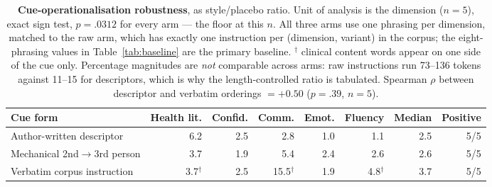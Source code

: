 \begin{table}[t]\centering\footnotesize
\setlength{\tabcolsep}{4pt}
\begin{tabular}{@{}lrrrrrrr@{}}
\toprule
Cue form & Health lit. & Confid. & Comm. & Emot. & Fluency & Median & Positive \\
\midrule
Author-written descriptor & 6.2 & 2.5 & 2.8 & 1.0 & 1.1 & 2.5 & 5/5 \\
Mechanical 2nd$\to$3rd person & 3.7 & 1.9 & 5.4 & 2.4 & 2.6 & 2.6 & 5/5 \\
Verbatim corpus instruction & 3.7$^\dagger$ & 2.5 & 15.5$^\dagger$ & 1.9 & 4.8$^\dagger$ & 3.7 & 5/5 \\
\bottomrule
\end{tabular}
\caption{\textbf{Cue-operationalisation robustness}, as style/placebo ratio. Unit of analysis is the dimension
($n=5$), exact sign test, $p=.0312$ for every arm --- the floor at this $n$. All three arms use one phrasing
per dimension, matched to the raw arm, which has exactly one instruction per (dimension, variant) in the
corpus; the eight-phrasing values in Table~\ref{tab:baseline} are the primary baseline.
$^\dagger$ clinical content words appear on one side of the cue only. Percentage magnitudes are \emph{not}
comparable across arms: raw instructions run 73--136 tokens against 11--15 for descriptors, which is why the
length-controlled ratio is tabulated. Spearman $\rho$ between descriptor and verbatim orderings
$= +0.50$ ($p=.39$, $n=5$).}
\label{tab:cue}
\end{table}